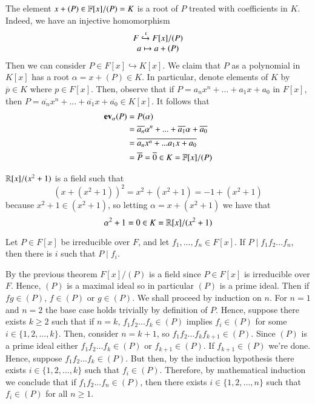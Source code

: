 \documentclass[12pt, a4paper, twoside, openright, titlepage]{book}
\begin{document}
\begin{note}{}{}
        The element $x+(P) \in \mathbb F[x]/(P) = K$ is a root of $P$ treated with coefficients in $K$. Indeed, we have an injective homomorphism \begin{equation}
                \begin{array}{c} F\xhookrightarrow{\iota} F[x]/(P) \\ a \mapsto a+(P) \end{array}
        \end{equation}
        Then we can consider $P \in F[x] \hookrightarrow K[x]$. We claim that $P$ as a polynomial in $K[x]$ has a root $\alpha = x+(P) \in K$. In particular, denote elements of $K$ by $\overline{p} \in K$ where $p \in F[x]$. Then, observe that if $P = a_nx^n+...+a_1x+a_0$ in $F[x]$, then $P = \overline{a_n}x^n+...+\overline{a_1}x+\overline{a_0} \in K[x]$. It follows that \begin{align*}
                \operatorname{\bf{ev}}_{\alpha}(P) &= P(\alpha) \\
                &= \overline{a_n}\alpha^n+...+\overline{a_1}\alpha+\overline{a_0}\\
                &= \overline{a_nx^n + ... a_1x+a_0} \\
                &= \overline{P} = \overline{0} \in K = \mathbb F[x]/(P)
        \end{align*}
\end{note}

\begin{eg}{}{}
        $\mathbb R[x]/(x^2+1)$ is a field such that \begin{equation}
                (x+(x^2+1))^2 = x^2+(x^2+1) = -1+(x^2+1)
        \end{equation}
        because $x^2+1 \in (x^2+1)$, so letting $\alpha = x+(x^2+1)$ we have that \begin{equation}
                \alpha^2+1 = 0 \in K = \mathbb R[x]/(x^2+1)
        \end{equation}
\end{eg}


\begin{cor}{}{}
    Let $P \in F[x]$ be irreducible over $F$, and let $f_1,...,f_n \in F[x]$. If $P\;\vert\;f_1f_2...f_n$, then there is $i$ such that $P\;\vert\;f_i$.
\end{cor}
\begin{proof*}{}{}
    By the previous theorem $F[x]/(P)$ is a field since $P \in F[x]$ is irreducible over $F$. Hence, $(P)$ is a maximal ideal so in particular $(P)$ is a prime ideal. Then if $fg \in (P)$, $f\in (P)$ or $g \in (P)$. We shall proceed by induction on $n$. For $n = 1$ and $n = 2$ the base case holds trivially by definition of $P$. Hence, suppose there exists $k \geq 2$ such that if $n = k$, $f_1f_2...f_k \in (P)$ implies $f_i \in (P)$ for some $i \in \{1,2,...,k\}$. Then, consider $n = k+1$, so $f_1f_2...f_kf_{k+1} \in (P)$. Since $(P)$ is a prime ideal either $f_1f_2...f_k \in (P)$ or $f_{k+1} \in (P)$. If $f_{k+1} \in (P)$ we're done. Hence, suppose $f_1f_2...f_k \in (P)$. But then, by the induction hypothesis there exists $i \in \{1,2,...,k\}$ such that $f_i \in (P)$. Therefore, by mathematical induction we conclude that if $f_1f_2...f_n \in (P)$, then there exists $i \in \{1,2,...,n\}$ such that $f_i \in (P)$ for all $n \geq 1$.
\end{proof*}
\end{document}
